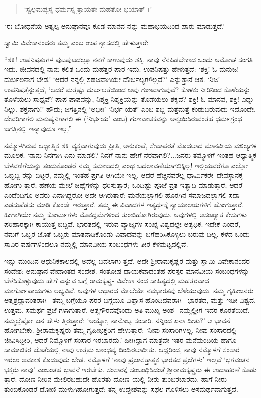 \begin{verse}
‘ಸ್ವಲ್ಪಮಪ್ಯಸ್ಯ ಧರ್ಮಸ್ಯ ತ್ರಾಯತೇ ಮಹತೋ ಭಯಾತ್ ।’
\end{verse}

‘ಈ ಬೋಧನೆಯ ಅತ್ಯಲ್ಪ ಅನುಷ್ಠಾನವೂ ಕೂಡ ಮಾನವ ನನ್ನು ಮಹಾಭಯದಿಂದ ಪಾರು ಮಾಡುತ್ತದೆ.’

ಸ್ವಾಮಿ ವಿವೇಕಾನಂದರು ತಮ್ಮ  ಎಂಬ ಉಪ ನ್ಯಾಸದಲ್ಲಿ ಹೇಳುತ್ತಾರೆ:

“ಶಕ್ತಿ! ಉಪನಿಷತ್ತುಗಳ ಪುಟಪುಟದಲ್ಲೂ ನನಗೆ ಕಾಣುವುದು ಶಕ್ತಿ. ನಾವು ನೆನಪಿಡಬೇಕಾದ ಒಂದು ಅಮೋಘ ಸಂಗತಿ ಇದು. ಜೀವನದಲ್ಲಿ ನಾನು ಕಲಿತ ಒಂದು ಮಹತ್ತರ ಪಾಠ ಇದು. ಉಪನಿಷತ್ತು ಹೇಳುತ್ತದೆ: ‘ಶಕ್ತಿ! ಓ ಮನುಜ! ದುರ್ಬಲನಾಗ ಬೇಡ.’ ‘ಆದರೆ ನನ್ನಲ್ಲಿ ಸಹಜವಾಗಿಯೇ ದೌರ್ಬಲ್ಯಗಳಿಲ್ಲವೆ?’ ಎನ್ನುತ್ತಾನೆ ಆತ. ‘ನಿಜ’ ಉಪನಿಷತ್ತೆನ್ನುತ್ತದೆ, ‘ಆದರೆ ಮತ್ತಷ್ಟು ದುರ್ಬಲತೆಯಿಂದ ಅವು ಗುಣವಾಗುವುವೆ? ಕೊಳಕು ನೀರಿನಿಂದ ಕೊಳೆಯನ್ನು ತೊಳೆಯಲು ಸಾಧ್ಯವೆ? ಪಾಪ ಪಾಪವನ್ನು, ನಿಶ್ಶಕ್ತಿ ನಿಶ್ಶಕ್ತಿಯನ್ನು ತೊಡೆಯಲು ಶಕ್ಯವೆ? ಶಕ್ತಿ! ಓ ಮಾನವ, ಶಕ್ತಿ! ಎದ್ದು ನಿಲ್ಲು, ಶಕ್ತನಾಗು!’ ಹೌದು; ಜಗತ್ತಿನಲ್ಲಿ ‘ಅಭೀಃ’ ‘ನಿರ್ಭ ಯತೆ’ ಎಂಬ ಶಬ್ದ ಮತ್ತೆಮತ್ತೆ ಕಂಡುಬರುವುದು ಇದೊಂದೇ. ದೇವರಿಗಾಗಲಿ ಮನುಷ್ಯನಿಗಾಗಲಿ ಈ (‘ನಿರ್ಭಯ’ ಎಂಬ) ಗುಣವಾಚಕವನ್ನು ಅನ್ವಯಿಸಿರುವಂತಹ ಧರ್ಮಗ್ರಂಥ ಜಗತ್ತಿನಲ್ಲಿ ಇನ್ನಾವುದೂ ಇಲ್ಲ.”

ನಮ್ಮೊಳಗಿರುವ ಆಧ್ಯಾತ್ಮಿಕ ಶಕ್ತಿ ವ್ಯಕ್ತವಾಗುವುದು ಪ್ರೀತಿ, ಅನುಕಂಪೆ, ಸೇವಾಪರತೆ ಮೊದಲಾದ ಮಾನವೀಯ ಮೌಲ್ಯಗಳ ಮೂಲಕ. ‘ನಾನು ನಿನಗಾಗಿ ಏನು ಮಾಡಲಿ? ನಿನಗೆ ನಾನು ಹೇಗೆ ನೆರವಾಗಲಿ?...ಜನರು ತಮ್ಮೊಳಗೆ ಇಂತಹ ಆಧ್ಯಾತ್ಮಿಕ ಬೆಳವಣಿಗೆಯನ್ನು ತಂದುಕೊಂಡರೆ ನಮ್ಮ ಸಮಾಜದಲ್ಲಿ ಎಂಥ ಬದಲಾವಣೆಯಾಗಲಿಕ್ಕಿಲ್ಲ! ಇಲ್ಲಿಯವರೆಗೂ ಎಲ್ಲೋ ಒಬ್ಬಿಬ್ಬ ರನ್ನು ಬಿಟ್ಟರೆ, ನಮ್ಮಲ್ಲಿ ಇಂತಹ ಪ್ರಗತಿ ಆಗಿಯೇ ಇಲ್ಲ. ಆದರೆ ಹೆಚ್ಚಿನವರೆಲ್ಲ ಧಾರ್ಮಿಕರೇ–ದೇವಸ್ಥಾನಕ್ಕೆ ಹೋಗು ತ್ತಾರೆ; ಹಣೆಯ ಮೇಲೆ ಚಿಹ್ನೆಗಳನ್ನು ಧರಿಸುತ್ತಾರೆ; ಒಂದಿಷ್ಟು ಪೂಜೆ ವ್ರತ ಇತ್ಯಾದಿ ಮಾಡುತ್ತಾರೆ; ಆದರೆ ಎಂದೆಂದಿಗೂ ಅವರು ಏನಾಗಿದ್ದರೋ ಅದೇ ಆಗಿರುತ್ತಾರೆ: ಮನೆಯಲ್ಲಾಗಲಿ ಹೊರಗಿನ ಸಮಾಜದಲ್ಲಾಗಲಿ ಸದಾ ಎಡಸುಪೆಡಸು ಮಾಡಿ ಕೊಂಡೇ ಇರುತ್ತಾರೆ. ತಮ್ಮ ಈ ವಿವಾದಗಳ ಇತ್ಯರ್ಥಕ್ಕೆ ನ್ಯಾಯಾಲಯಗಳಿಗೆ ಹೋಗುತ್ತಾರೆ. ಹೀಗಾಗಿಯೇ ನಮ್ಮ ಕೋರ್ಟುಗಳು ಮೊಕದ್ದಮೆಗಳಿಂದ ತುಂಬಿಹೋಗಿರುವುದು. ಅವುಗಳಲ್ಲಿ ಅಸಂಖ್ಯಾತ ಕೇಸುಗಳು ಪರಿಹಾರಕ್ಕಾಗಿ ಕಾಯುತ್ತ ಬಿದ್ದಿವೆ. ಭಾರತದಲ್ಲಿ ಇರುವ ವ್ಯಾಜ್ಯಗಳ ಸಂಖ್ಯೆ ವಿಶ್ವದಲ್ಲೇ ಅತ್ಯಧಿಕ. ಇದೇಕೆ ಎಂದರೆ, ನಮಗೆ ಒಬ್ಬರ ಜೊತೆ ಒಬ್ಬರು ಮಾತನಾಡಿಕೊಂಡು ವಿವಾದವನ್ನು ಬಗೆಹರಿಸಿಕೊಳ್ಳಲು ಬರುವು ದಿಲ್ಲ. ಕಳೆದ ಒಂದು ಸಾವಿರ ವರ್ಷಗಳಿಂದಲೂ ನಮ್ಮಲ್ಲಿ ಮಾನವೀಯ ಸಂಬಂಧಗಳು ತೀರ ಕೆಳಮಟ್ಟದಲ್ಲಿವೆ.

ಇನ್ನು ಮುಂದಿನ ಆಧುನಿಕಕಾಲದಲ್ಲಿ ಅದೆಲ್ಲ ಬದಲಾಗು ತ್ತದೆ. ಅದೇ ಶ್ರೀರಾಮಕೃಷ್ಣರ ಮತ್ತು ಸ್ವಾಮಿ ವಿವೇಕಾನಂದರ ಸಂದೇಶ; ಅನುಷ್ಠಾನ ವೇದಾಂತದ ಸಂದೇಶ. ಸಂತೋಷ ದಾಯಕವಾದಂತಹ ಪರಸ್ಪರ ಮಾನವೀಯ ಸಂಬಂಧಗಳನ್ನು ಬೆಳೆಸಿಕೊಳ್ಳುವುದು ಹೇಗೆ ಎನ್ನುವ ಬಗ್ಗೆ ರಾಮಕೃಷ್ಣ- ವಿವೇಕಾ ನಂದ ಸಾಹಿತ್ಯದಲ್ಲಿ ಮಹತ್ತರವಾದ ಮಾರ್ಗೋಪಾಯಗಳು ಲಭ್ಯವಿವೆ. ಅವುಗಳ ಆಧಾರದ ಮೇಲೆಯೇ ನವಭಾರತವು ಬೆಳೆಯುವುದು. ನಮ್ಮ ಗೃಹೀಜನರು ಆತ್ಮಶ್ರದ್ಧಾವಂತರಾಗಿ– ತಮ್ಮ ಬಗ್ಗೆಯೂ ಪರರ ಬಗ್ಗೆಯೂ ವಿಶ್ವಾಸ ಹೊಂದಿದವರಾಗಿ –ಭಾರತದ, ಮತ್ತು ಇಡೀ ವಿಶ್ವದ, ಉತ್ತಮ, ಸಮರ್ಥ ಪ್ರಜೆ ಗಳಾಗುತ್ತಾರೆ. ಆತ್ಮಗೌರವವೊಂದು ಅತಿ ಮುಖ್ಯ ಅಂಶ– ನಮ್ಮಲ್ಲೀಗ ಇದರ ಕೊರತೆಯಿದೆ. ನಮ್ಮಲ್ಲೆಷ್ಟೋ ಜನ ಹೇಳು ತ್ತಿರುತ್ತಾರೆ: ‘ಅಯ್ಯೋ, ನಾನೊಬ್ಬ ಸಂಸಾರಿ. ನನ್ನಿಂದ ಏನಾ ದೀತು?’ ಆ ಭಾವನೆ ಹೋಗಬೇಕು. ಶ್ರೀರಾಮಕೃಷ್ಣರು ತಮ್ಮ ಗೃಹೀಭಕ್ತರಿಗೆ ಹೇಳುತ್ತಾರೆ: ‘ನೀವು ಸಂಸಾರಿಗಳಲ್ಲ. ನೀವು ಸಂಸಾರದಲ್ಲಿ ಜೀವಿಸಿದ್ದೀರಿ, ಆದರೆ ನಿಮ್ಮೊಳಗೆ ಸಂಸಾರ ಇರಬಾರದು.’ ಹೀಗಿದ್ದಾಗ ಮಾತ್ರವೇ ಇತರ ಮನೆಮಂದಿಯ ಹಾಗೂ ಸಾಮಾಜಿಕರ ಜೊತೆಯಲ್ಲಿ ನಾವು ಉತ್ತಮ ಬಾಂಧವ್ಯ ದಿಂದಿರಲಾದೀತು. ಆದ್ದರಿಂದ, ನಾವು ನಮ್ಮೊಳಗೆ ಸಂಸಾರ ಇರಲು ಅವಕಾಶ ಕೊಡುವುದು ಬೇಡ. ನಮ್ಮೊಳಗೆ ‘ನಾವು ಪ್ರಜಾಸತ್ತಾತ್ಮಕ ಭಾರತದ ಪ್ರಜೆಗಳು’ ಇಲ್ಲವೆ ‘ಭಗವಂತನ ಭಕ್ತರು ನಾವು’ ಎಂಬಂತಹ ಭಾವನೆ ಇರಬೇಕು. ಸಂಸಾರಕ್ಕೆ ಸಂಬಂಧಿಸಿದಂತೆ ಶ್ರೀರಾಮಕೃಷ್ಣರು ಈ ಉದಾಹರಣೆ ಕೊಡು ತ್ತಾರೆ: ದೋಣಿ ನೀರಿನ ಮೇಲಿರಬಹುದೇ ಹೊರತು ದೋಣಿ ಯಲ್ಲಿ ನೀರು ತುಂಬಿರಬಾರದು. ಹಾಗೆ ನೀರು ತುಂಬಿಕೊಂಡರೆ ದೋಣಿ ಮುಳುಗಿಹೋಗುತ್ತದೆ; ತನ್ನ ಉದ್ದೇಶವನ್ನು ಸಫಲ ಗೊಳಿಸಲು ಅಸಮರ್ಥವಾಗುತ್ತದೆ.

